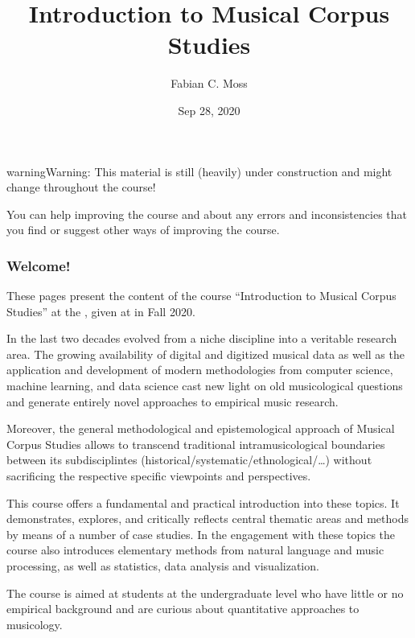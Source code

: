 \documentclass[letterpaper,10pt,english]{sphinxmanual}
\title{Introduction to Musical Corpus Studies}
\date{Sep 28, 2020}
\author{Fabian C.\@{} Moss}
\begin{document}
\pagestyle{empty}
\sphinxmaketitle
\pagestyle{plain}
\sphinxtableofcontents
\pagestyle{normal}
\label{\detokenize{index::doc}}


\begin{sphinxadmonition}{warning}{Warning:}
This material is still (heavily) under construction and might change throughout the course!

You can help improving the course and  about any errors and inconsistencies that you find
or suggest other ways of improving the course.
\end{sphinxadmonition}
\subsubsection*{Welcome!}

These pages present the content of the course “Introduction to Musical Corpus Studies” at the ,
given at  in Fall 2020.

In the last two decades  evolved from a niche discipline into a veritable research area.
The growing availability of digital and digitized musical data as well as the application and development of modern
methodologies from computer science, machine learning, and data science cast new light on old musicological questions
and generate entirely novel approaches to empirical music research.

Moreover, the general methodological and epistemological approach of Musical Corpus Studies allows to transcend traditional
intra\sphinxhyphen{}musicological boundaries between its sub\sphinxhyphen{}disciplintes (historical/systematic/ethnological/…) without sacrificing the
respective specific viewpoints and perspectives.

This course offers a fundamental and practical introduction into these topics.
It demonstrates, explores, and critically reflects central thematic areas and methods by means of a number of case studies.
In the engagement with these topics the course also introduces elementary methods from natural language and music processing,
as well as statistics, data analysis and visualization.

The course is aimed at students at the undergraduate level who have little or no empirical background and are curious
about quantitative approaches to musicology.
\end{document}
